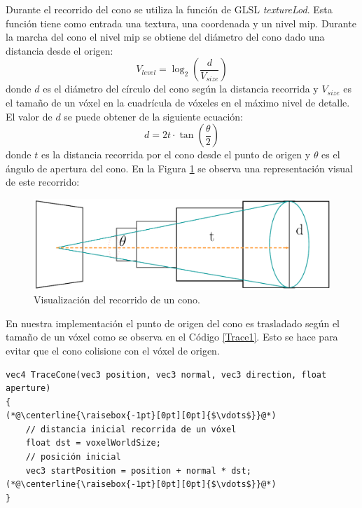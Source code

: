 Durante el recorrido del cono se utiliza la función de GLSL \emph{textureLod}. Esta función tiene como entrada una textura, una coordenada y un nivel mip. Durante la marcha del cono el nivel mip se obtiene del diámetro del cono dado una distancia desde el origen:
\begin{equation}
    V_{level} = \log_2\left(\frac{d}{V_{size}}\right)
\end{equation} donde $d$ es el diámetro del círculo del cono según la distancia recorrida y $V_{size}$ es el tamaño de un vóxel en la cuadrícula de vóxeles en el máximo nivel de detalle. El valor de $d$ se puede obtener de la siguiente ecuación:
\begin{equation}
    d = 2t\cdot\tan\left(\frac{\theta}{2}\right)
\end{equation} donde $t$ es la distancia recorrida por el cono desde el punto de origen y $\theta$ es el ángulo de apertura del cono. En la Figura \ref{fig:cone_trace_impl_fi} se observa una representación visual de este recorrido:
\begin{figure}[H]
    \centering
    \captionsetup{justification=centering}
    \includegraphics[width=.9\linewidth]{media/cone.pdf}
    \caption{Visualización del recorrido de un cono.}
    \label{fig:cone_trace_impl_fi}
\end{figure}

En nuestra implementación el punto de origen del cono es trasladado según el tamaño de un vóxel como se observa en el Código \ref{Trace1}. Esto se hace para evitar que el cono colisione con el vóxel de origen.
\\
\begin{lstlisting}[caption={Traslado de origen del cono.}, label=Trace1]
vec4 TraceCone(vec3 position, vec3 normal, vec3 direction, float aperture)
{
(*@\centerline{\raisebox{-1pt}[0pt][0pt]{$\vdots$}}@*)
    // distancia inicial recorrida de un vóxel 
    float dst = voxelWorldSize;
    // posición inicial
    vec3 startPosition = position + normal * dst;
(*@\centerline{\raisebox{-1pt}[0pt][0pt]{$\vdots$}}@*)
}
\end{lstlisting}

